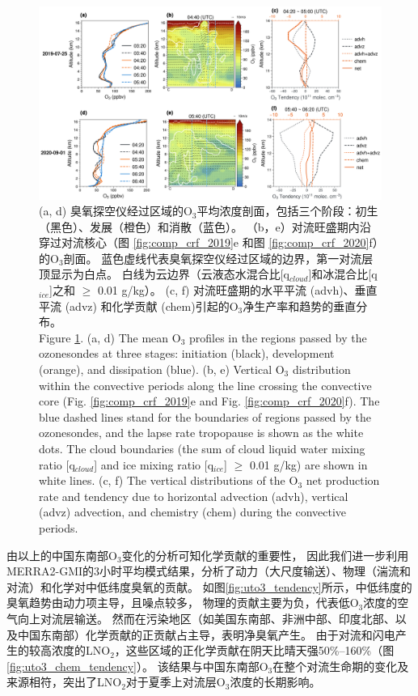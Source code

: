 \begin{figure}[!htbp]
\centering
\includegraphics[width=\textwidth]{./figures/tendency_o3.png}
\caption{
(a, d) 臭氧探空仪经过区域的O$_3$平均浓度剖面，包括三个阶段：初生（黑色）、发展（橙色）和消散（蓝色）。
（b，e）对流旺盛期内沿穿过对流核心（图 \ref{fig:comp_crf_2019}e 和图 \ref{fig:comp_crf_2020}f）的O$_3$剖面。
蓝色虚线代表臭氧探空仪经过区域的边界，第一对流层顶显示为白点。
白线为云边界（云液态水混合比[q$_{cloud}$]和冰混合比[q$_{ice}$]之和 $\geq$ 0.01 g/kg）。
(c, f) 对流旺盛期的水平平流 (advh)、垂直平流 (advz) 和化学贡献 (chem)引起的O$_3$净生产率和趋势的垂直分布。
\\
Figure \ref{fig:tendency_o3}. (a, d) The mean O$_3$ profiles in the regions passed by the ozonesondes
at three stages: initiation (black), development (orange), and dissipation (blue).
(b, e) Vertical O$_3$ distribution within the convective periods along the line crossing the convective core (Fig. \ref{fig:comp_crf_2019}e and Fig. \ref{fig:comp_crf_2020}f).
The blue dashed lines stand for the boundaries of regions passed by the ozonesondes, and the lapse rate tropopause is shown as the white dots.
The cloud boundaries (the sum of cloud liquid water mixing ratio [q$_{cloud}$] and ice mixing ratio [q$_{ice}$] $\geq$ 0.01 g/kg) are shown in white lines.
(c, f) The vertical distributions of the O$_3$ net production rate and tendency due to horizontal advection (advh), vertical (advz) advection, and chemistry (chem) during the convective periods.
}
\label{fig:tendency_o3}
\end{figure}


由以上的中国东南部O$_3$变化的分析可知化学贡献的重要性，
因此我们进一步利用MERRA2-GMI的3小时平均模式结果，分析了动力（大尺度输送）、物理（湍流和对流）和化学对中低纬度臭氧的贡献。
如图\ref{fig:uto3_tendency}所示，中低纬度的臭氧趋势由动力项主导，且噪点较多，
物理的贡献主要为负，代表低O$_3$浓度的空气向上对流层输送。
然而在污染地区（如美国东南部、非洲中部、印度北部、以及中国东南部）化学贡献的正贡献占主导，表明净臭氧产生。
由于对流和闪电产生的较高浓度的LNO$_2$，这些区域的正化学贡献在阴天比晴天强50\%--160\%（图\ref{fig:uto3_chem_tendency}）。
该结果与中国东南部O$_3$在整个对流生命期的变化及来源相符，突出了LNO$_2$对于夏季上对流层O$_3$浓度的长期影响。

